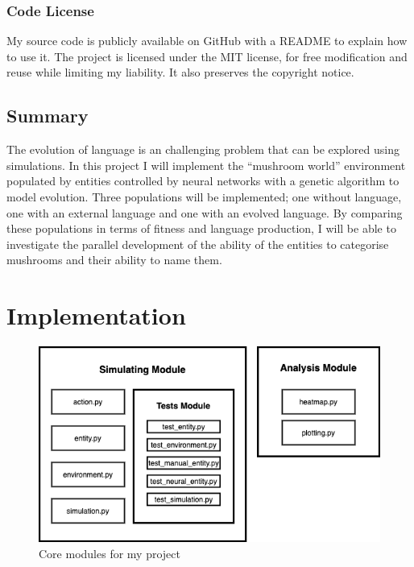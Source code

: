 \documentclass[12pt,a4paper,twoside,openright]{report}
\begin{document}
\subsection{Code License}

My source code is publicly available on GitHub with a README to explain how to use it. The project is licensed under the MIT license, for free modification and reuse while limiting my liability. It also preserves the copyright notice.

\section{Summary}\label{section:summary}

The evolution of language is an challenging problem that can be explored using simulations. In this project I will implement the ``mushroom world'' environment populated by entities controlled by neural networks with a genetic algorithm to model evolution. Three populations will be implemented; one without language, one with an external language and one with an evolved language. By comparing these populations in terms of fitness and language production, I will be able to investigate the parallel development of the ability of the entities to categorise mushrooms and their ability to name them.


\chapter{Implementation}


\begin{figure}[t]
  \centering
  \includegraphics[width=.8\linewidth]{figs/modules}
  \caption{Core modules for my project}
  \label{fig:modules}
\end{figure}
\end{document}
